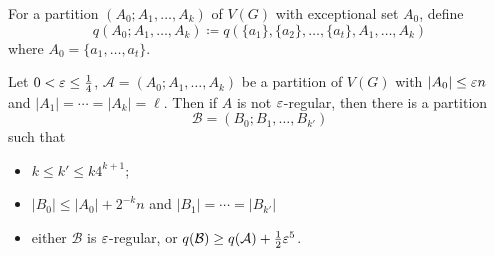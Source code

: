 \documentclass[main.tex]{subfiles}
\begin{document}
For a partition $(A_0; A_1,\ldots,A_k)$ of $V(G)$ with exceptional set $A_0$,
define
\[
  q(A_0;A_1,\ldots,A_k)\coloneqq q(\{a_1\},\{a_2\},\ldots,\{a_t\},A_1,\ldots,A_k)
\]
where $A_0 = \{a_1,\ldots,a_t\}$.
\begin{lemma}
  Let $0 < \varepsilon\leq\frac 1 4$, $\mathcal A = (A_0; A_1,\ldots, A_k)$ be a
  partition of $V(G)$ with $|A_0|\leq\varepsilon n$ and $|A_1| = \cdots = |A_k| = \ell$.
  Then if $A$ is not $\varepsilon$-regular, then there is a partition
  \[
    \mathcal B = (B_0; B_1,\ldots,B_{k'})
  \]
  such that

  \begin{itemize}
    \item $k\leq k'\leq k 4^{k+1}$;
    \item $|B_0|\leq |A_0| + 2^{-k}n$ and $|B_1| = \cdots = |B_{k'}|$
    \item either $\mathcal B$ is $\varepsilon$-regular,
      or $q(\mathcal B)\geq q(\mathcal A) + \frac{1}{2}\varepsilon^5$.
  \end{itemize}
\end{lemma}
\end{document}
